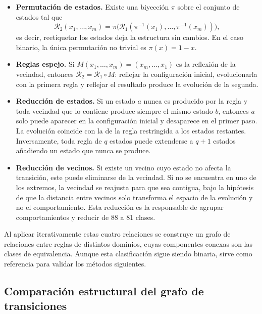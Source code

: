 \begin{itemize}
	\item \textbf{Permutación de estados.} Existe una biyección $\pi$ sobre el conjunto de estados tal que
	\[
	\mathcal{R}_2(x_1, \dots, x_m) = \pi\bigl(\mathcal{R}_1(\pi^{-1}(x_1), \dots, \pi^{-1}(x_m))\bigr),
	\]
	es decir, reetiquetar los estados deja la estructura sin cambios. En el caso binario, la única permutación no trivial es $\pi(x) = 1 - x$.
	
	\item \textbf{Reglas espejo.} Si $M(x_1, \dots, x_m) = (x_m, \dots, x_1)$ es la reflexión de la vecindad, entonces $\mathcal{R}_2 = \mathcal{R}_1 \circ M$: reflejar la configuración inicial, evolucionarla con la primera regla y reflejar el resultado produce la evolución de la segunda.
	
	\item \textbf{Reducción de estados.} Si un estado $a$ nunca es producido por la regla y toda vecindad que lo contiene produce siempre el mismo estado $b$, entonces $a$ solo puede aparecer en la configuración inicial y desaparece en el primer paso. La evolución coincide con la de la regla restringida a los estados restantes. Inversamente, toda regla de $q$ estados puede extenderse a $q + 1$ estados añadiendo un estado que nunca se produce.
	
	\item \textbf{Reducción de vecinos.} Si existe un vecino cuyo estado no afecta la transición, este puede eliminarse de la vecindad. Si no se encuentra en uno de los extremos, la vecindad se reajusta para que sea contigua, bajo la hipótesis de que la distancia entre vecinos solo transforma el espacio de la evolución y no el comportamiento. Esta reducción es la responsable de agrupar comportamientos y reducir de 88 a 81 clases.
\end{itemize}

Al aplicar iterativamente estas cuatro relaciones se construye un grafo de relaciones entre reglas de distintos dominios, cuyas componentes conexas son las clases de equivalencia. Aunque esta clasificación sigue siendo binaria, sirve como referencia para validar los métodos siguientes.

\subsection{Comparación estructural del grafo de transiciones}

